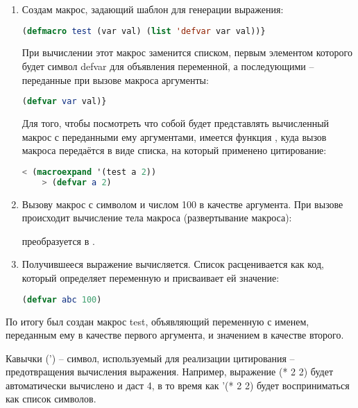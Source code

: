 \begin{enumerate}
	\item Создам макрос, задающий шаблон для генерации выражения:
	
	\begin{lstlisting}[language=Lisp, frame=none]
	(defmacro test (var val) (list 'defvar var val))}
	\end{lstlisting}
	
	При вычислении этот макрос заменится списком, первым элементом которого будет символ defvar для объявления переменной, а последующими -- переданные при вызове макроса аргументы:
	
	\begin{lstlisting}[language=Lisp, frame=none]
	(defvar var val)}
	\end{lstlisting}
	
	Для того, чтобы посмотреть что собой будет представлять вычисленный макрос с переданными ему аргументами, имеется функция , куда вызов макроса передаётся в виде списка, на который применено цитирование:
	
	\begin{lstlisting}[language=Lisp, frame=none]
	< (macroexpand '(test a 2))
	> (defvar a 2)
	\end{lstlisting}
	
	\item Вызову макрос с символом  и числом 100 в качестве аргумента. При вызове происходит вычисление тела макроса (развертывание макроса):
	
	 преобразуется в .
	
	\item Получившееся выражение вычисляется. Список расценивается как код, который определяет переменную и присваивает ей значение:
	
	\begin{lstlisting}[language=Lisp, frame=none]
	(defvar abc 100)
	\end{lstlisting}
\end{enumerate}

По итогу был создан макрос test, объявляющий переменную с именем, переданным ему в качестве первого аргумента, и значением в качестве второго.

Кавычки (') -- символ, используемый для реализации цитирования -- предотвращения вычисления выражения. Например, выражение (* 2 2) будет автоматически вычислено и даст 4, в то время как '(* 2 2) будет восприниматься как список символов.

